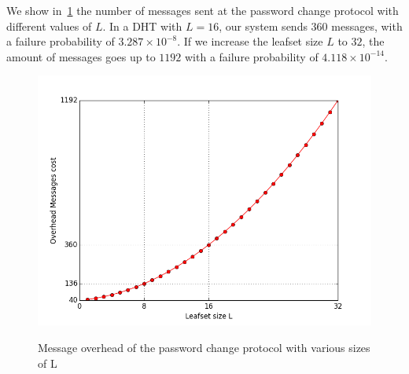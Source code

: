     We show in~\ref{fig:password_change_messages} the number of messages sent at
the password change protocol with different values of $L$. In a DHT with
$L = 16$, our system sends $360$ messages, with a failure probability of
 $3.287 \times 10^{-8}$. If we increase the leafset size $L$ to $32$, the amount of
messages goes up to $1192$ with a failure probability of $4.118 \times 10^{-14}$.

\begin{figure}[!htb]
\centering
\includegraphics[width=14cm]{../plots/password_change_messages}\\
\caption{Message overhead of the password change protocol with various sizes of L}
\label{fig:password_change_messages}
\end{figure}

